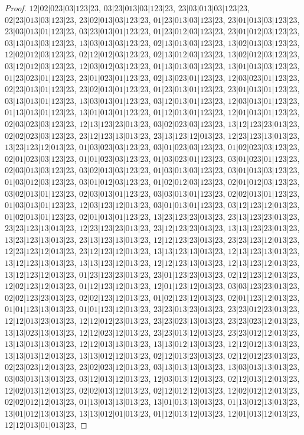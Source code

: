 \documentclass[12pt]{article}
\theoremstyle{plain}
\theoremstyle{definition}
\theoremstyle{remark}
\begin{document}
\begin{proof}
$12|02|023|03|123|23$, $03|23|013|03|123|23$, $23|03|013|03|123|23$, $02|23|013|03|123|23$, $23|02|013|03|123|23$, $01|23|013|03|123|23$, $23|01|013|03|123|23$, $23|03|013|01|123|23$, $03|23|013|01|123|23$, $01|23|012|03|123|23$, $23|01|012|03|123|23$, $03|13|013|03|123|23$, $13|03|013|03|123|23$, $02|13|013|03|123|23$, $13|02|013|03|123|23$, $12|02|012|03|123|23$, $02|12|012|03|123|23$, $02|13|012|03|123|23$, $13|02|012|03|123|23$, $03|12|012|03|123|23$, $12|03|012|03|123|23$, $01|13|013|03|123|23$, $13|01|013|03|123|23$, $01|23|023|01|123|23$, $23|01|023|01|123|23$, $02|13|023|01|123|23$, $12|03|023|01|123|23$, $02|23|013|01|123|23$, $23|02|013|01|123|23$, $01|23|013|01|123|23$, $23|01|013|01|123|23$, $03|13|013|01|123|23$, $13|03|013|01|123|23$, $03|12|013|01|123|23$, $12|03|013|01|123|23$, $01|13|013|01|123|23$, $13|01|013|01|123|23$, $01|12|013|01|123|23$, $12|01|013|01|123|23$, $02|03|023|03|123|23$, $12|13|123|23|013|23$, $03|02|023|03|123|23$, $13|12|123|23|013|23$, $02|02|023|03|123|23$, $23|12|123|13|013|23$, $23|13|123|12|013|23$, $12|23|123|13|013|23$, $13|23|123|12|013|23$, $01|03|023|03|123|23$, $03|01|023|03|123|23$, $01|02|023|03|123|23$, $02|01|023|03|123|23$, $01|01|023|03|123|23$, $01|03|023|01|123|23$, $03|01|023|01|123|23$, $02|03|013|03|123|23$, $03|02|013|03|123|23$, $01|03|013|03|123|23$, $03|01|013|03|123|23$, $01|03|012|03|123|23$, $03|01|012|03|123|23$, $01|02|012|03|123|23$, $02|01|012|03|123|23$, $03|02|013|01|123|23$, $02|03|013|01|123|23$, $03|03|013|01|123|23$, $02|02|013|01|123|23$, $01|03|013|01|123|23$, $12|03|123|12|013|23$, $03|01|013|01|123|23$, $03|12|123|12|013|23$, $01|02|013|01|123|23$, $02|01|013|01|123|23$, $13|23|123|23|013|23$, $23|13|123|23|013|23$, $23|23|123|13|013|23$, $12|23|123|23|013|23$, $23|12|123|23|013|23$, $13|13|123|23|013|23$, $13|23|123|13|013|23$, $23|13|123|13|013|23$, $12|12|123|23|013|23$, $23|23|123|12|013|23$, $12|23|123|12|013|23$, $23|12|123|12|013|23$, $13|13|123|13|013|23$, $12|13|123|13|013|23$, $13|12|123|13|013|23$, $13|13|123|12|013|23$, $12|12|123|13|013|23$, $12|13|123|12|013|23$, $13|12|123|12|013|23$, $01|23|123|23|013|23$, $23|01|123|23|013|23$, $02|12|123|12|013|23$, $12|02|123|12|013|23$, $01|12|123|12|013|23$, $12|01|123|12|013|23$, $03|03|123|23|013|23$, $02|02|123|23|013|23$, $02|02|123|12|013|23$, $01|02|123|12|013|23$, $02|01|123|12|013|23$, $01|01|123|13|013|23$, $01|01|123|12|013|23$, $23|23|013|23|013|23$, $23|23|012|23|013|23$, $12|12|013|23|013|23$, $12|12|012|23|013|23$, $23|23|023|13|013|23$, $23|23|023|12|013|23$, $13|13|023|13|013|23$, $12|12|023|12|013|23$, $23|23|013|12|013|23$, $23|23|012|12|013|23$, $13|13|013|13|013|23$, $12|12|013|13|013|23$, $13|13|012|13|013|23$, $12|12|012|13|013|23$, $13|13|013|12|013|23$, $13|13|012|12|013|23$, $02|12|013|23|013|23$, $02|12|012|23|013|23$, $02|23|023|12|013|23$, $23|02|023|12|013|23$, $03|13|013|13|013|23$, $13|03|013|13|013|23$, $03|03|013|13|013|23$, $03|12|013|12|013|23$, $12|03|013|12|013|23$, $02|12|013|12|013|23$, $12|02|013|12|013|23$, $02|02|013|12|013|23$, $02|12|012|12|013|23$, $12|02|012|12|013|23$, $02|02|012|12|013|23$, $01|13|013|13|013|23$, $13|01|013|13|013|23$, $01|13|012|13|013|23$, $13|01|012|13|013|23$, $13|13|012|01|013|23$, $01|12|013|12|013|23$, $12|01|013|12|013|23$, $12|12|013|01|013|23$, 
\end{proof}
\end{document}
